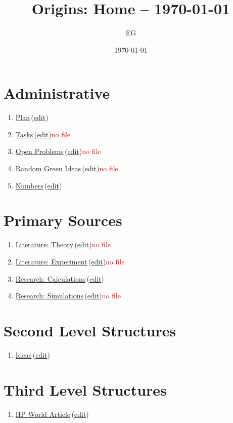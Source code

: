 \documentclass[12pt]{paper}
\title{Origins: Home -- \today}
\author{EG}
\date{\today}
\newcommand{\red}[1]{\textcolor{red}{#1}}
\newcommand{\wikilink}[2] { \href{#1.pdf}{#2}\,(\href{#1.tex}{edit})}
\begin{document}
 \maketitle
 \tableofcontents
 
\section{Administrative}


\begin{enumerate}
 \item \wikilink{plan}{Plan}
 \item \wikilink{tasks}{Tasks}\red{no file}
 \item \wikilink{open\_problems}{Open Problems}\red{no file}
 \item \wikilink{green\_ideas}{Random Green Ideas}\red{no file}
 \item \wikilink{numbers}{Numbers}
 
\end{enumerate}

\section{Primary Sources}
\begin{enumerate}
 \item \wikilink{literature\_theory}{Literature: Theory}\red{no file}
 \item \wikilink{literature\_experiment}{Literature: Experiment}\red{no file}
 \item \wikilink{research\_calculations}{Research: Calculations}
 \item \wikilink{research\_simulations}{Research: Simulations}\red{no file}
\end{enumerate}

\section{Second Level Structures}
\begin{enumerate}
 \item \wikilink{ideas}{Ideas}
\end{enumerate}

\section{Third Level Structures}


\begin{enumerate}
 \item \wikilink{hp\_world}{HP World Article}
\end{enumerate}




% 
% 

 
\end{document}
